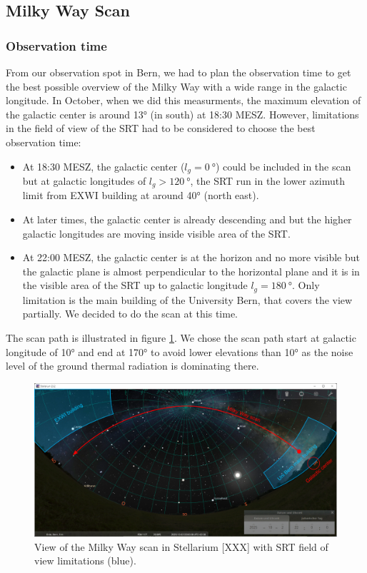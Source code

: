 
\pagebreak

\subsection{Milky Way Scan}

\subsubsection{Observation time}
From our observation spot in Bern, we had to plan the observation time to get the best possible overview of the Milky Way with a wide range in the galactic longitude. In October, when we did this measurments, the maximum elevation of the galactic center is around 13° (in south) at 18:30 MESZ. However, limitations in the field of view of the SRT had to be considered to choose the best observation time:

\begin{itemize}
    \item At 18:30 MESZ, the galactic center ($l_g=\SI{0}{\degree}$) could be included in the scan but at galactic longitudes of $l_g>\SI{120}{\degree}$, the SRT run in the lower azimuth limit from EXWI building at around 40° (north east).
    \item At later times, the galactic center is already descending and but the higher galactic longitudes are moving inside visible area of the SRT.
    \item At 22:00 MESZ, the galactic center is at the horizon and no more visible but the galactic plane is almost perpendicular to the horizontal plane and it is in the visible area of the SRT up to galactic longitude $l_g=\SI{180}{\degree}$. Only limitation is the main building of the University Bern, that covers the view partially. We decided to do the scan at this time. 
\end{itemize}
    
The scan path is illustrated in figure \ref{fig:mw_scan_stellarium}. We chose the scan path start at galactic longitude of 10° and end at 170° to avoid lower elevations than 10° as the noise level of the ground thermal radiation is dominating there.


\begin{figure}[H]
    \centering
    \includegraphics[width=12cm]{assets/stellariumView_edit.png}
    \caption{View of the Milky Way scan in Stellarium [XXX] with SRT field of view limitations (blue).}
    \label{fig:mw_scan_stellarium}
\end{figure}

